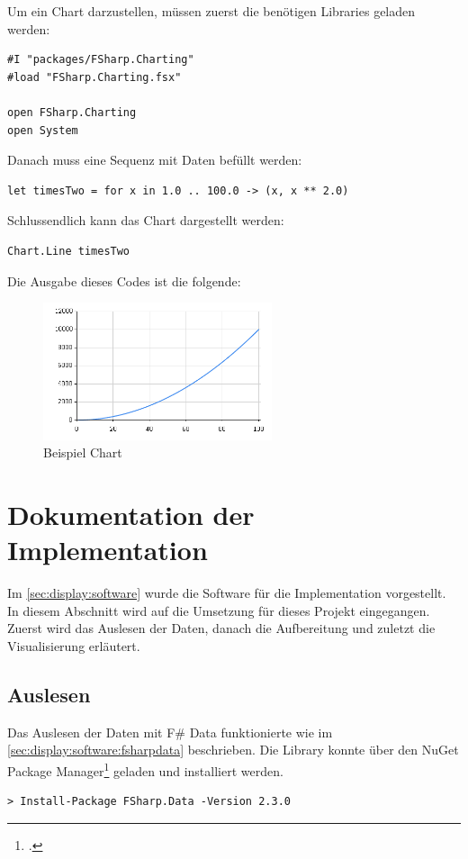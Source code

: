 Um ein Chart darzustellen, müssen zuerst die benötigen Libraries geladen werden:
\begin{lstlisting}
#I "packages/FSharp.Charting"
#load "FSharp.Charting.fsx"

open FSharp.Charting
open System
\end{lstlisting}

Danach muss eine Sequenz mit Daten befüllt werden:
\begin{lstlisting}
let timesTwo = for x in 1.0 .. 100.0 -> (x, x ** 2.0)
\end{lstlisting}

Schlussendlich kann das Chart dargestellt werden:
\begin{lstlisting}
Chart.Line timesTwo
\end{lstlisting}

Die Ausgabe dieses Codes ist die folgende:
\begin{figure}[H]
  \centering
  \includegraphics[width=0.6\textwidth]{./images/charting-timestwo.png}
  \caption{Beispiel Chart}
\end{figure}


\section{Dokumentation der Implementation}
Im \cref{sec:display:software}  wurde die Software für die Implementation vorgestellt. In diesem Abschnitt wird auf die Umsetzung für dieses Projekt eingegangen. Zuerst wird das Auslesen der Daten, danach die Aufbereitung und zuletzt die Visualisierung erläutert.

\subsection{Auslesen}
\label{sec:display:documentation:reading}
Das Auslesen der Daten mit F\# Data funktionierte wie im \cref{sec:display:software:fsharpdata}  beschrieben. Die Library konnte über den NuGet Package Manager\footcite{NuGet_2016-06-18} geladen und installiert werden.
\begin{lstlisting}
> Install-Package FSharp.Data -Version 2.3.0
\end{lstlisting}

